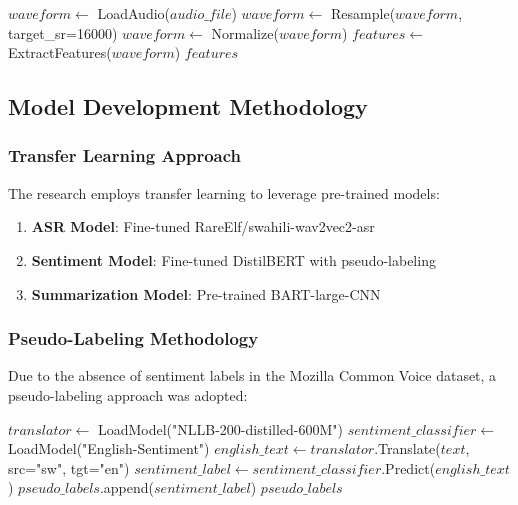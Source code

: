 \documentclass[12pt,a4paper]{report}
\begin{document}
\begin{algorithm}[H]
\caption{Audio Preprocessing Pipeline}
\begin{algorithmic}[1]
    \State $waveform \gets$ LoadAudio($audio\_file$)
    \State $waveform \gets$ Resample($waveform$, target\_sr=16000)
    \State $waveform \gets$ Normalize($waveform$)
    \State $features \gets$ ExtractFeatures($waveform$)
    \State \Return $features$
\EndProcedure
\end{algorithmic}
\end{algorithm}

\subsection{Model Development Methodology}
\subsubsection{Transfer Learning Approach}
The research employs transfer learning to leverage pre-trained models:

\begin{enumerate}
    \item \textbf{ASR Model}: Fine-tuned RareElf/swahili-wav2vec2-asr
    \item \textbf{Sentiment Model}: Fine-tuned DistilBERT with pseudo-labeling
    \item \textbf{Summarization Model}: Pre-trained BART-large-CNN
\end{enumerate}

\subsubsection{Pseudo-Labeling Methodology}
\label{sec:pseudo_labeling}
Due to the absence of sentiment labels in the Mozilla Common Voice dataset, a pseudo-labeling approach was adopted:

\begin{algorithm}[H]
\caption{Pseudo-Labeling for Sentiment Analysis}
\begin{algorithmic}[1]
    \State $translator \gets$ LoadModel("NLLB-200-distilled-600M")
    \State $sentiment\_classifier \gets$ LoadModel("English-Sentiment")
        \State $english\_text \gets translator$.Translate($text$, src="sw", tgt="en")
        \State $sentiment\_label \gets sentiment\_classifier$.Predict($english\_text$)
        \State $pseudo\_labels$.append($sentiment\_label$)
    \EndFor
    \State \Return $pseudo\_labels$
\EndProcedure
\end{algorithmic}
\end{algorithm}
\end{document}
